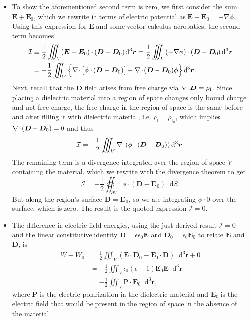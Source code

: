 \documentclass[11pt, a4paper]{article}
\newcommand{\diff}{\mathop{}\!\mathrm{d}} %
\newcommand{\dr}{\diff^{3} \r}  %
\renewcommand{\vec}[1]{\bm{#1}} %
\renewcommand{\r}{\vec{r}}
\newcommand{\E}{\vec{E}} %
\newcommand{\D}{\vec{D}}  %
\renewcommand{\P}{\vec{P}}  %
\newcommand{\ee}{\epsilon_{0}}  %
\renewcommand{\div}{\nabla \mspace{-2mu} \cdot \mspace{-2mu}}
\renewcommand{\grad}{\nabla}
\begin{document}
\begin{itemize}
    \item To show the aforementioned second term is zero, we first consider the sum $ \E + \E_{0} $, which we rewrite in terms of electric potential as $ \E + \E_{0} = - \grad \phi $. Using this expression for $ \E $ and some vector calculus acrobatics, the second term becomes
	\begin{align*}
        \mathcal{I} & \equiv \frac{1}{2}\iiint_{V}(\E + \E_{0})\cdot (\D - \D_{0})\dr = \frac{1}{2}\iiint_{V} (- \grad \phi) \cdot (\D - \D_{0}) \dr \\
        & = -\frac{1}{2}\iiint_{V}\Big\{ \div \big[ \phi \cdot (\D - \D_{0}) \big] - \div (\D - \D_{0})\phi \Big\}\dr.
	\end{align*}
    Next, recall that the $ \D $ field arises from free charge via $ \div \D = \rho_{\text{f}} $. Since placing a dielectric material into a region of space changes only bound charge and not free charge, the free charge in the region of space is the same before and after filling it with dielectric material, i.e. $ \rho_{\text{f}} = \rho_{\text{f}_{0}}$, which implies $ \div (\D - \D_{0}) = 0 $ and thus
    \begin{equation*}
        \mathcal{I} = -\frac{1}{2}\iiint_{V}\div (\phi \cdot (\D - \D_{0}))\dr.
    \end{equation*}
	The remaining term is a divergence integrated over the region of space $ V $ containing the material, which we rewrite with the divergence theorem to get
	\begin{equation*}
        \mathcal{I} = -\frac{1}{2}\oiint_{\partial V} \phi \cdot (\D - \D_{0})\diff S.
	\end{equation*}
    But along the region's surface $ \D = \D_{0} $, so we are integrating $ \phi \cdot 0 $ over the surface, which is zero. The result is the quoted expression $ \mathcal{I} = 0 $.
	
    \item The difference in electric field energies, using the just-derived result $ \mathcal{I} = 0 $ and the linear constitutive identity $ \D = \epsilon \ee \E $  and $ \D_{0} = \ee \E_{0} $ to relate $ \E $ and $ \D $, is
	\begin{align*}
		W - W_{0}  &= \frac{1}{2}\iiint_{V}(\E \cdot \D_{0} - \E_{0}\cdot\D)\dr + 0\\
		& = - \frac{1}{2}\iiint_{V} \ee(\epsilon - 1)\E_{0}\E \dr\\
		& = -\frac{1}{2}\iiint_{V}\P \cdot \E_{0}\dr,
	\end{align*}
	where $ \P $ is the electric polarization in the dielectric material and $ \E_{0} $ is the electric field that would be present in the region of space in the absence of the material.
	
\end{itemize}
\end{document}
